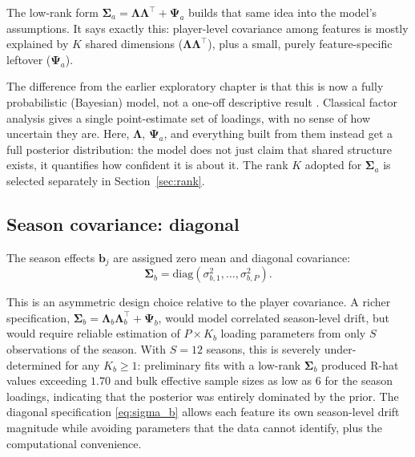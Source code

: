The low-rank form $\boldsymbol{\Sigma}_a = \boldsymbol{\Lambda}\boldsymbol{\Lambda}^\top + \boldsymbol{\Psi}_a$ builds that same idea into the model's assumptions. It says exactly this: player-level covariance among features is mostly explained by $K$ shared dimensions ($\boldsymbol{\Lambda}\boldsymbol{\Lambda}^\top$), plus a small, purely feature-specific leftover ($\boldsymbol{\Psi}_a$).

The difference from the earlier exploratory chapter is that this is now a fully probabilistic (Bayesian) model, not a one-off descriptive result \cite{lopes2004bayesian}. Classical factor analysis gives a single point-estimate set of loadings, with no sense of how uncertain they are. Here, $\boldsymbol{\Lambda}$, $\boldsymbol{\Psi}_a$, and everything built from them instead get a full posterior distribution: the model does not just claim that shared structure exists, it quantifies how confident it is about it. The rank $K$ adopted for $\boldsymbol{\Sigma}_a$ is selected separately in Section~\ref{sec:rank}.

\subsection{Season covariance: diagonal}

\begin{remark}
\label{rem:sigma_b}
The season effects $\mathbf{b}_j$ are assigned zero mean and diagonal covariance:
\begin{equation}
\boldsymbol{\Sigma}_b = \mathrm{diag}(\sigma_{b,1}^2, \ldots, \sigma_{b,P}^2).
\label{eq:sigma_b}
\end{equation}
\end{remark}

This is an asymmetric design choice relative to the player covariance. A richer specification, $\boldsymbol{\Sigma}_b = \boldsymbol{\Lambda}_b\boldsymbol{\Lambda}_b^\top + \boldsymbol{\Psi}_b$, would model correlated season-level drift, but would require reliable estimation of $P \times K_b$ loading parameters from only $S$ observations of the season. With $S = 12$ seasons, this is severely under-determined for any $K_b \geq 1$: preliminary fits with a low-rank $\boldsymbol{\Sigma}_b$ produced R-hat values exceeding $1.70$ and bulk effective sample sizes as low as $6$ for the season loadings, indicating that the posterior was entirely dominated by the prior. The diagonal specification \eqref{eq:sigma_b} allows each feature its own season-level drift magnitude while avoiding parameters that the data cannot identify, plus the computational convenience.

